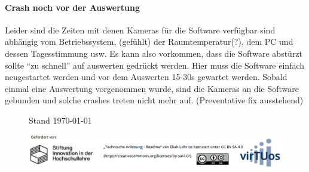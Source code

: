 \documentclass[a4paper, 10pt]{article}
\begin{document}
\paragraph{Crash noch vor der Auswertung} Leider sind die Zeiten mit denen  Kameras für die Software verfügbar sind abhängig vom Betriebssystem, (gefühlt) der Raumtemperatur(?), dem PC und dessen Tagesstimmung usw. Es kann also vorkommen, dass die Software abstürzt sollte \enquote{zu schnell} auf auswerten gedrückt werden. Hier muss die Software einfach neugestartet werden und vor dem Auswerten 15-30s gewartet werden. Sobald einmal eine Auswertung vorgenommen wurde, sind die Kameras an die Software gebunden und solche crashes treten nicht mehr auf. {\scriptsize(Preventative fix ausstehend)}



\begin{figure}[b]
    \begin{flushleft}
        \hspace*{7.4mm}
        {\footnotesize Stand \today}
    \end{flushleft}
    \vspace{-3.5mm}
    \centering
    \includegraphics[width=14.61cm]{funding+license.png}
\end{figure}
\end{document}
